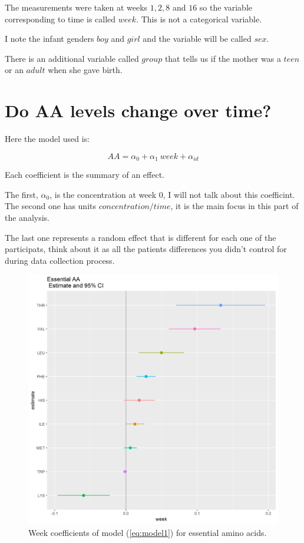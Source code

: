 \documentclass[12pt]{article}
\begin{document}
The measurements were taken at weeks $1, 2, 8$ and $16$ so the variable corresponding to time is called $week$. This is not a categorical variable.

I note the infant genders $boy$ and $girl$ and the variable will be called $sex$.

There is an additional variable called $group$ that tells us if the mother was a $teen$ or an $adult$ when she gave birth.

\section{Do AA levels change over time?}

Here the model used is:

\begin{equation} \label{eq:model1}
  AA = \alpha_0 + \alpha_1 \ week + \alpha_{id}
\end{equation}

Each coefficient is the summary of an effect.

The first, $\alpha_0$, is the concentration at week $0$, I will not talk about this coefficint. The second one has units $concentration/time$, it is the main focus in this part of the analysis.

The last one represents a random effect that is different for each one of the participats, think about it as all the patients differences you didn't control for during data collection process.


\begin{figure}[ht]
  \includegraphics[width= \textwidth]{../week/EAA_W_coeff.png}
  \caption{Week coefficients of model (\ref{eq:model1}) for essential amino acids.}
  \label{fig:EAA_W_coeff}
\end{figure}
\end{document}

